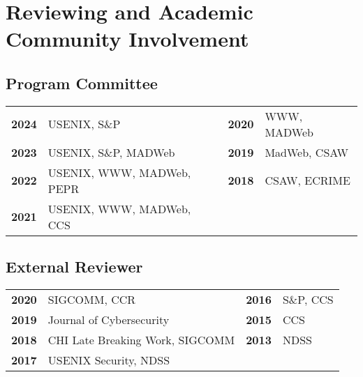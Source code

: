 \documentclass[wideaddress]{vitae}
\begin{document}
  
    \nocite{chouaki2023search}
    \nocite{mcquistin2023psl}
    \nocite{snyder2023poolparty}
    \nocite{randall2022uid}
    \nocite{davidson2022star}
    \nocite{smith2022blocked}
    \nocite{jueckstock2022stateful}
    \nocite{smith2021sugarcoat}
    \nocite{jueckstock2021measurements}
    \nocite{chen2021javascriptsigs}
    \nocite{snyder2020filters}
    \nocite{sjosten2020generation}
    \nocite{papadopoulos2020paywalls}
    \nocite{iqbal2020adgraph}
    \nocite{ghasemisharif2019speedreader}
    \nocite{snyder2017browser}
    \nocite{snyder2017doxing}
    \nocite{snyder2017cdf}
    \nocite{snyder2016browser}
    \nocite{snyder2016characterizing}
    \nocite{snyder2016phishing}
    \nocite{snyder2015no}
    \nocite{clark2015saw}
    \nocite{snyder2014yao}
    \nocite{snyder2014cloudsweeper}
    \nocite{snyder2013cloudsweeper}
  

  \section{Reviewing and Academic Community Involvement}
  \subsection{Program Committee}
  \begin{tabular}{p{}p{}p{}p{}}
    \textbf{2024} & USENIX, S\&P &           \textbf{2020} & WWW, MADWeb \\
    \textbf{2023} & USENIX, S\&P, MADWeb &   \textbf{2019} & MadWeb, CSAW \\
    \textbf{2022} & USENIX, WWW, MADWeb, PEPR & \textbf{2018} & CSAW, ECRIME \\
    \textbf{2021} & USENIX, WWW, MADWeb, CCS \\
  \end{tabular}

  \subsection{External Reviewer}
  \begin{tabular}{p{}p{}p{}p{}}
    \textbf{2020} & SIGCOMM, CCR &                    \textbf{2016} & S\&P, CCS \\
    \textbf{2019} & Journal of Cybersecurity &        \textbf{2015} & CCS \\
    \textbf{2018} & CHI Late Breaking Work, SIGCOMM & \textbf{2013} & NDSS \\
    \textbf{2017} & USENIX Security, NDSS \\
  \end{tabular}
\end{document}
